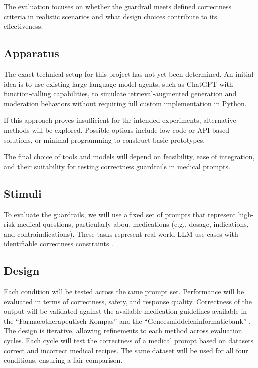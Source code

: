 \documentclass[a4paper,doc,natbib]{apa6}
\begin{document}
    The evaluation focuses on whether the guardrail meets defined correctness criteria in realistic scenarios and what design choices contribute to its effectiveness.

    \subsection{Apparatus}

    The exact technical setup for this project has not yet been determined. An initial idea is to use existing large language model agents, such as ChatGPT with function-calling capabilities, to simulate retrieval-augmented generation and moderation behaviors without requiring full custom implementation in Python.

    If this approach proves insufficient for the intended experiments, alternative methods will be explored. Possible options include low-code or API-based solutions, or minimal programming to construct basic prototypes.

    The final choice of tools and models will depend on feasibility, ease of integration, and their suitability for testing correctness guardrails in medical prompts.

    \subsection{Stimuli}

    To evaluate the guardrails, we will use a fixed set of prompts that represent high-risk medical questions, particularly about medications (e.g., dosage, indications, and contraindications).
    These tasks represent real-world LLM use cases with identifiable correctness constraints \citep{pais2024medication}.

    \subsection{Design}

    Each condition will be tested across the same prompt set.
    Performance will be evaluated in terms of correctness, safety, and response quality.
    Correctness of the output will be validated against the available medication guidelines available in the ``Farmacotherapeutisch Kompas'' \cite{farmacotherapeutischkompas} and the ``Geneesmiddeleninformatiebank'' \citep{geneesmiddeleninformatiebank}.
    The design is iterative, allowing refinements to each method across evaluation cycles.
    Each cycle will test the correctness of a medical prompt based on datasets correct and incorrect medical recipes.
    The same dataset will be used for all four conditions, ensuring a fair comparison.
\end{document}
